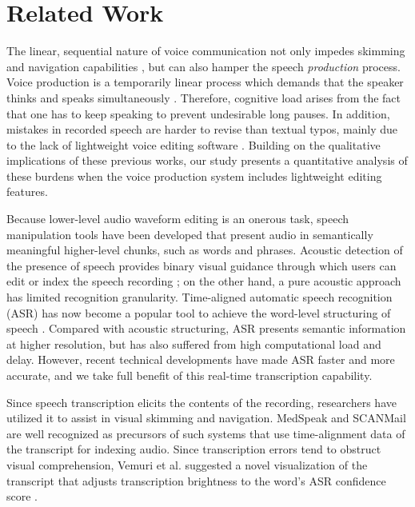 \section{Related Work}

The linear, sequential nature of voice communication not only impedes skimming and navigation capabilities \cite{grudin}, but can also hamper the speech \emph{production} process. 
Voice production is a temporarily linear process which demands that the speaker thinks and speaks simultaneously \cite{marriott2002, yoon:2015}.
Therefore, cognitive load arises from the fact that one has to keep speaking to prevent undesirable long pauses. 
In addition, mistakes in recorded speech are harder to revise than textual typos, mainly due to the lack of lightweight voice editing software \cite{marriott2002}.  
Building on the qualitative implications of these previous works, our study presents a quantitative analysis of these burdens when the voice production system includes lightweight editing features.

Because lower-level audio waveform editing is an onerous task, speech manipulation tools have been developed that present audio in semantically meaningful higher-level chunks, such as words and phrases.
Acoustic detection of the presence of speech provides binary visual guidance through which users can edit or index the speech recording \cite{ades1986, hindus:1992}; on the other hand, a pure acoustic approach has limited recognition granularity.
Time-aligned automatic speech recognition (ASR) has now become a popular tool to achieve the word-level structuring of speech \cite{Schmandt81, Wilcox:1992}. 
Compared with acoustic structuring, ASR presents semantic information at higher resolution, but has also suffered from high computational load and delay. 
However, recent technical developments have made ASR faster and more accurate, and we take full benefit of this real-time transcription capability.

Since speech transcription elicits the contents of the recording, researchers have utilized it to assist in visual skimming and navigation. 
MedSpeak \cite{Lai:1997} and SCANMail \cite{whittaker} are well recognized as precursors of such systems that use time-alignment data of the transcript for indexing audio. 
Since transcription errors tend to obstruct visual comprehension, Vemuri et al. suggested a novel visualization of the transcript that adjusts transcription brightness to the word's ASR confidence score \cite{Vemuri:2004}. 

